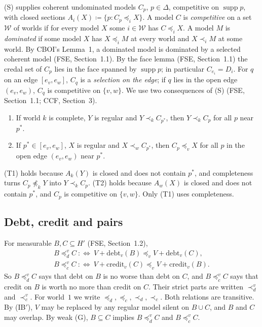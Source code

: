 \documentclass[11pt]{article}
\theoremstyle{definition}\newtheorem{definition}[theorem]{Definition}
\theoremstyle{remark}\newtheorem{remark}[theorem]{Remark}
\newcommand{\supp}{\operatorname{supp}}
\newcommand{\debt}{\mathrm{debt}}
\newcommand{\cred}{\mathrm{credit}}
\begin{document}
(S) supplies coherent undominated models $C_p$, $p\in\Delta$, competitive on
$\supp p$, with closed sections $A_i(X)\coloneqq\{p:C_p\preceq_iX\}$. A model
$C$ is \emph{competitive} on a set $\mathcal W$ of worlds if for every model
$X$ some $i\in\mathcal W$ has $C\preceq_iX$. A model $M$ is \emph{dominated} if some model $X$ has
$X\preceq_iM$ at every world and $X\prec_iM$ at some world. By CBOI's
Lemma~1, a dominated model is dominated by a selected coherent model (FSE,
Section~1.1). By the face lemma (FSE, Section~1.1) the credal set of $C_p$
lies in the face spanned by $\supp p$; in particular $C_{e_i}=D_i$. For $q$
on an edge $[e_v,e_w]$, $C_q$ is a \emph{selection on the edge}; if $q$ lies
in the open edge $(e_v,e_w)$, $C_q$ is competitive on $\{v,w\}$. We use two
consequences of (S) (FSE, Section~1.1; CCF, Section~3).
\begin{enumerate}[label=(T\arabic*),leftmargin=*,itemsep=2pt]
\item If world $k$ is complete, $Y$ is regular and $Y\prec_kC_{p^*}$, then
$Y\prec_kC_p$ for all $p$ near $p^*$.
\item If $p^*\in[e_v,e_w]$, $X$ is regular and $X\prec_wC_{p^*}$, then
$C_p\preceq_vX$ for all $p$ in the open edge $(e_v,e_w)$ near $p^*$.
\end{enumerate}
(T1) holds because $A_k(Y)$ is closed and does not contain $p^*$, and
completeness turns $C_p\not\preceq_kY$ into $Y\prec_kC_p$. (T2) holds
because $A_w(X)$ is closed and does not contain $p^*$, and $C_p$ is
competitive on $\{v,w\}$. Only (T1) uses completeness.

\subsection{Debt, credit and pairs}\label{sec:pairs}

For measurable $B,C\subseteq H'$ (FSE, Section~1.2),
\begin{gather*}
 B\preceq^v_dC\ :\Longleftrightarrow\ V+\debt_v(B)\preceq_vV+\debt_v(C),\\
 B\preceq^v_cC\ :\Longleftrightarrow\ V+\cred_v(C)\preceq_vV+\cred_v(B).
\end{gather*}
So $B\preceq^v_dC$ says that debt on $B$ is no worse than debt on $C$, and
$B\preceq^v_cC$ says that credit on $B$ is worth no more than credit on $C$.
Their strict parts are written $\prec^v_d$ and $\prec^v_c$. For world~$1$ we
write $\preceq_d,\preceq_c,\prec_d,\prec_c$. Both relations are transitive.
By (IB$'$), $V$ may be replaced by any regular model silent on $B\cup C$,
and $B$ and $C$ may overlap. By weak (G), $B\subseteq C$ implies
$B\preceq^v_dC$ and $B\preceq^v_cC$.
\end{document}
